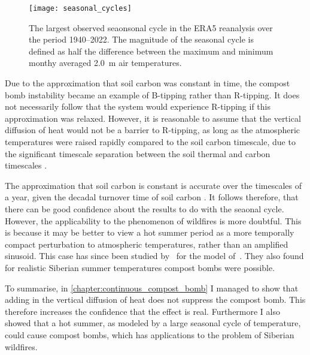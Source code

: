 \begin{figure}
  \centering
  \texttt{[image: seasonal\_cycles]}
  \caption[Map of Seasonal Cycles]{The largest observed seaonsonal cycle in the ERA5 reanalysis \parencite{Hersbach2020} over the period 1940--2022.
    The magnitude of the seasonal cycle is defined as half the difference between the maximum and minimum monthy averaged \SI{2.0}{\meter} air temperatures.}
  \label{fig:seasonal_cycle_maps}
\end{figure}


Due to the approximation that soil carbon was constant in time, the compost bomb instability became an example of B-tipping rather than R-tipping. It does not necessarily
follow that the system would experience R-tipping if this approximation was relaxed. However, it is reasonable to assume that the vertical diffusion of heat would not be a barrier to
R-tipping, as long as the atmospheric temperatures were raised rapidly compared to the soil carbon timescale, due to the significant timescale separation between the soil thermal and
carbon timescales \parencite{Luke2011}.

The approximation that soil carbon is constant is accurate over the timescales of a year, given the decadal turnover time of soil carbon \parencite{Varney2020}.
It follows therefore, that there can be good confidence about the results to do with the seaonal cycle. However, the applicability to the phenomenon of wildfires is more doubtful.
This is because it may be better to view a hot summer period as a more temporally compact perturbation to atmospheric temperatures, rather than an amplified sinusoid. This case has
since been studied by~\cite{OSullivan2023} for the model of~\cite{Luke2011}. They also found for realistic Siberian summer temperatures compost bombs were possible. 

To summarise, in \cref{chapter:continuous_compost_bomb} I managed to show that adding in the vertical diffusion of heat does not suppress the compost bomb. This therefore increases the confidence
that the effect is real. Furthermore I also showed that a hot summer, as modeled by a large seasonal cycle of temperature, could cause compost bombs, which has applications to the
problem of Siberian wildfires.

\subsubsection{}

